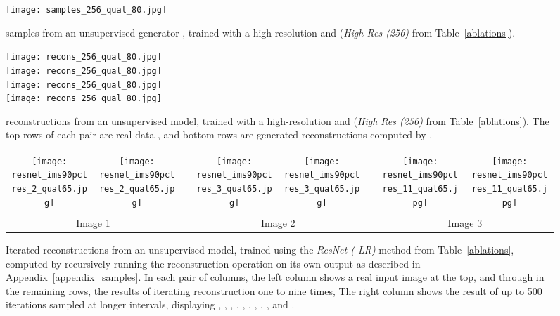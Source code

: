 \begin{figure}
\centering




 \texttt{[image: samples\_256\_qual\_80.jpg]}
 \caption{
   samples  from an unsupervised \method{} generator , trained with a high-resolution  and  (\textit{High Res  (256)} from Table~\ref{ablations}).
 }
 \label{fig:samples_256}
\end{figure}

\begin{figure}
\centering

 \texttt{[image: recons\_256\_qual\_80.jpg]}
 \\ \vspace{0.2cm}
 \texttt{[image: recons\_256\_qual\_80.jpg]}
 \\ \vspace{0.2cm}
 \texttt{[image: recons\_256\_qual\_80.jpg]}
 \\ \vspace{0.2cm}
 \texttt{[image: recons\_256\_qual\_80.jpg]}
 \caption{
   reconstructions from an unsupervised \method{} model, trained with a high-resolution  and  (\textit{High Res  (256)} from Table~\ref{ablations}).
  The top rows of each pair are real data , and bottom rows are generated reconstructions computed by .
}
 \label{fig:recons_256}
\end{figure}

\setlength{\tabcolsep}{2pt}
\begin{figure}
\centering
\begin{tabular}{cccccccc}
 \texttt{[image: resnet\_ims90pctres\_2\_qual65.jpg]} &
 \texttt{[image: resnet\_ims90pctres\_2\_qual65.jpg]} &
 &
 \texttt{[image: resnet\_ims90pctres\_3\_qual65.jpg]} &
 \texttt{[image: resnet\_ims90pctres\_3\_qual65.jpg]} &
 &
 \texttt{[image: resnet\_ims90pctres\_11\_qual65.jpg]} &
 \texttt{[image: resnet\_ims90pctres\_11\_qual65.jpg]} \\
  &  & &
  &  & &
  &  \\
 \multicolumn{2}{c}{Image 1} & &
 \multicolumn{2}{c}{Image 2} & &
 \multicolumn{2}{c}{Image 3} \\
\end{tabular}
 \caption{
  Iterated reconstructions from an unsupervised \method{} model, trained using the \textit{ResNet ( LR)} method from Table~\ref{ablations},
  computed by recursively running the reconstruction operation  on its own output as described in Appendix~\ref{appendix_samples}.
  In each pair of columns, the left column shows a real input image  at the top, and  through  in the remaining rows,
  the results of iterating reconstruction one to nine times,
  The right column shows the result of up to 500 iterations sampled at longer intervals, displaying
  ,
  ,
  ,
  ,
  ,
  ,
  ,
  ,
  , and
  .
}
 \label{fig:iterrecons}
\end{figure}
\setlength{\tabcolsep}{6pt}
